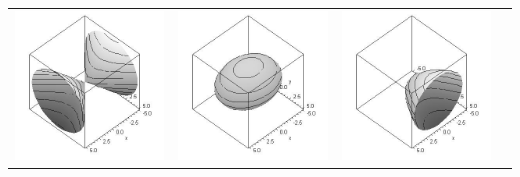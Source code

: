 \begin{center}
\begin{tabular}{cccc}
\includegraphics[width=\mywidth]{functions/quadric-6}&
\includegraphics[width=\mywidth]{functions/quadric-7}&
\includegraphics[width=\mywidth]{functions/quadric-8}

\end{tabular}
\end{center}

